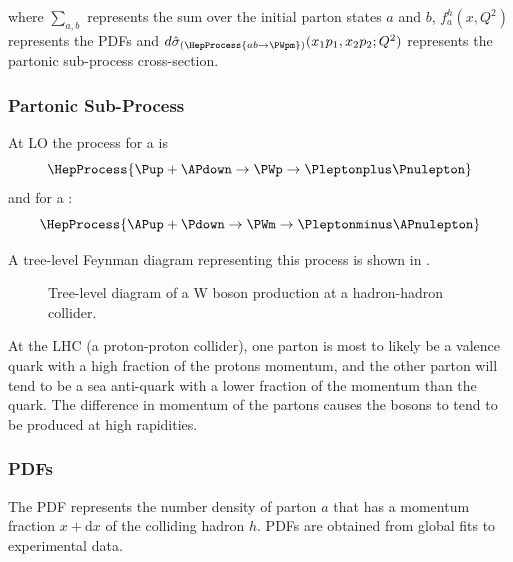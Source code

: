 where $\sum\limits_{a,b}$ represents the sum over the initial parton states $a$
and $b$, $f_a^{h}(x,Q^2)$ represents the \acp{PDF} and
$d\hat{\sigma}_{(\HepProcess{a b \to \PWpm})}(x_1 p_1, x_2 p_2; Q^2)$
represents the partonic sub-process cross-section.

\subsubsection*{Partonic Sub-Process}

At \ac{LO} the process for a \PWp is
\begin{equation}
  \HepProcess{\Pup + \APdown \to \PWp \to \Pleptonplus \Pnulepton} 
  \label{wbos:wpprod} 
\end{equation}
and for a \PWm:
\begin{equation}
  \HepProcess{\APup + \Pdown \to \PWm \to \Pleptonminus \APnulepton}
  \label{wbos:wmprod} 
\end{equation}

A tree-level Feynman diagram representing this process is shown in
.

\begin{figure}[htb]
  \centering
  \caption{Tree-level diagram of a W boson production at a hadron-hadron collider.}
  \label{wbos:feynman}
\end{figure}

At the \ac{LHC} (a proton-proton collider), one parton is most to likely be a
valence quark with a high fraction of the protons momentum, and the other
parton will tend to be a sea anti-quark with a lower fraction of the momentum
than the quark. The difference in momentum of the partons causes the \PW bosons 
to tend to be produced at high rapidities. 



\subsubsection*{\acp{PDF}} 
The \ac{PDF} represents the number density of parton $a$ that has a momentum
fraction $x+\mathrm{d}x$ of the colliding hadron $h$.  \acp{PDF} are obtained
from global fits to experimental data.\cite{Martin:2009iq} %

